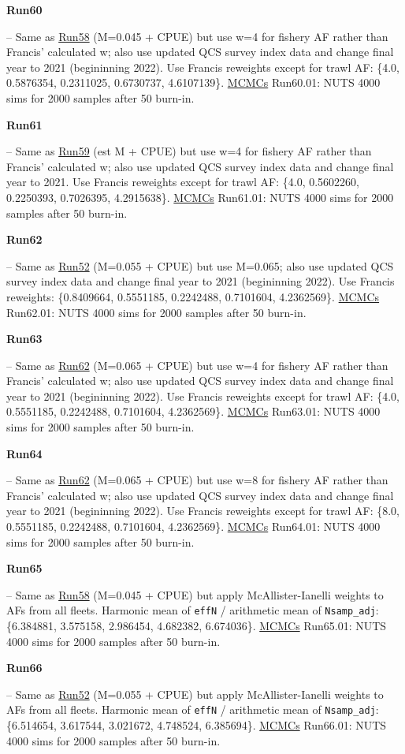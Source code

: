 \hypertarget{R60}{\textbf{Run60}} -- Same as \hyperlink{R58}{Run58} (M=0.045 + CPUE) but use w=4 for fishery AF rather than Francis' calculated w; also use updated QCS survey index data and change final year to 2021 (begininning 2022). Use Francis reweights except for trawl AF: \{4.0, 0.5876354, 0.2311025, 0.6730737, 4.6107139\}. \underline{MCMCs} Run60.01: NUTS 4000 sims for 2000 samples after 50\pc{} burn-in.

\hypertarget{R61}{\textbf{Run61}} -- Same as \hyperlink{R59}{Run59} (est M + CPUE) but use w=4 for fishery AF rather than Francis' calculated w; also use updated QCS survey index data and change final year to 2021. Use Francis reweights except for trawl AF: \{4.0, 0.5602260, 0.2250393, 0.7026395, 4.2915638\}. \underline{MCMCs} Run61.01: NUTS 4000 sims for 2000 samples after 50\pc{} burn-in.

\hypertarget{R62}{\textbf{Run62}} -- Same as \hyperlink{R52}{Run52} (M=0.055 + CPUE) but use M=0.065; also use updated QCS survey index data and change final year to 2021 (begininning 2022). Use Francis reweights: \{0.8409664, 0.5551185, 0.2242488, 0.7101604, 4.2362569\}. \underline{MCMCs} Run62.01: NUTS 4000 sims for 2000 samples after 50\pc{} burn-in.

\hypertarget{R63}{\textbf{Run63}} -- Same as \hyperlink{R62}{Run62} (M=0.065 + CPUE) but use w=4 for fishery AF rather than Francis' calculated w; also use updated QCS survey index data and change final year to 2021 (begininning 2022). Use Francis reweights except for trawl AF: \{4.0, 0.5551185, 0.2242488, 0.7101604, 4.2362569\}. \underline{MCMCs} Run63.01: NUTS 4000 sims for 2000 samples after 50\pc{} burn-in.

\hypertarget{R64}{\textbf{Run64}} -- Same as \hyperlink{R62}{Run62} (M=0.065 + CPUE) but use w=8 for fishery AF rather than Francis' calculated w; also use updated QCS survey index data and change final year to 2021 (begininning 2022). Use Francis reweights except for trawl AF: \{8.0, 0.5551185, 0.2242488, 0.7101604, 4.2362569\}. \underline{MCMCs} Run64.01: NUTS 4000 sims for 2000 samples after 50\pc{} burn-in.

\hypertarget{R65}{\textbf{Run65}} -- Same as \hyperlink{R58}{Run58} (M=0.045 + CPUE) but apply McAllister-Ianelli weights to AFs from all fleets. Harmonic mean of \texttt{effN} / arithmetic mean of \texttt{Nsamp\_adj}: \{6.384881, 3.575158, 2.986454, 4.682382, 6.674036\}. \underline{MCMCs} Run65.01: NUTS 4000 sims for 2000 samples after 50\pc{} burn-in.

\hypertarget{R66}{\textbf{Run66}} -- Same as \hyperlink{R52}{Run52} (M=0.055 + CPUE) but apply McAllister-Ianelli weights to AFs from all fleets.  Harmonic mean of \texttt{effN} / arithmetic mean of \texttt{Nsamp\_adj}: \{6.514654, 3.617544, 3.021672, 4.748524, 6.385694\}. \underline{MCMCs} Run66.01: NUTS 4000 sims for 2000 samples after 50\pc{} burn-in.

